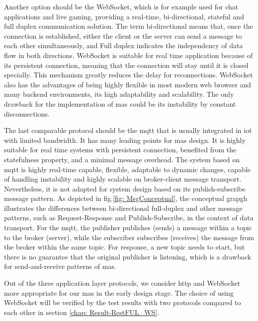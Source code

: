 Another option should be the WebSocket, which is for example used for chat 
applications and live gaming, providing a real-time, bi-directional, stateful and full 
duplex communication 
solution. The term bi-directional means that, once the connection is established, 
either the client or the server can send a message to each other simultaneously, and Full 
duplex indicates the independency of data flow in both directions. WebSocket is suitable 
for real time application because of its persistent connection, meaning that the connection 
will stay until it is closed specially. This mechanism greatly reduces the delay for 
reconnections. WebSocket also has the advantages of being highly flexible in most modern 
web browser and many backend environments, its high adaptability and scalability. The only 
drawback for the implementation of \gls{mas} could be its instability by constant disconnections. 


The last comparable protocol should be the \gls{mqtt} that is usually integrated in 
\gls{iot} with limited bandwidth. It has many leading points for 
\gls{mas} design. It is highly suitable for real time systems with persistent connection, 
benefited from the statefulness property, and a minimal message overhead. The system 
based on \gls{mqtt} is highly real-time capable, flexible, adaptable to dynamic changes, 
capable of handling instability and highly scalable on broker-client message transport. 
Nevertheless, it is not adapted for system design based on its publish-subscribe message pattern. 
As depicted in fig.\ref{fig: MsgConceptual}, the conceptual grapgh illustrates 
the differences between bi-directional 
full-duplex and other message patterns, such as Request-Response and Publish-Subscribe, 
in the context of data transport.
For the \gls{mqtt}, the publisher publishes (sends) a 
message within a topic to the broker (server), while the subscriber 
subscribes (receives) the message from the broker within the same topic. 
For response, a new topic needs to start, but there is no guarantee that the original publisher is listening, 
which is a drawback for send-and-receive patterns of \gls{mas}. 

Out of the three application layer protocols, we consider \gls{http} and 
WebSocket more appropriate for our 
\gls{mas} in the early design stage. The choice of using WebSocket will be verified 
by the test results with two protocols compared to each other in section \ref{chap: Result-RestFUL_WS}.


